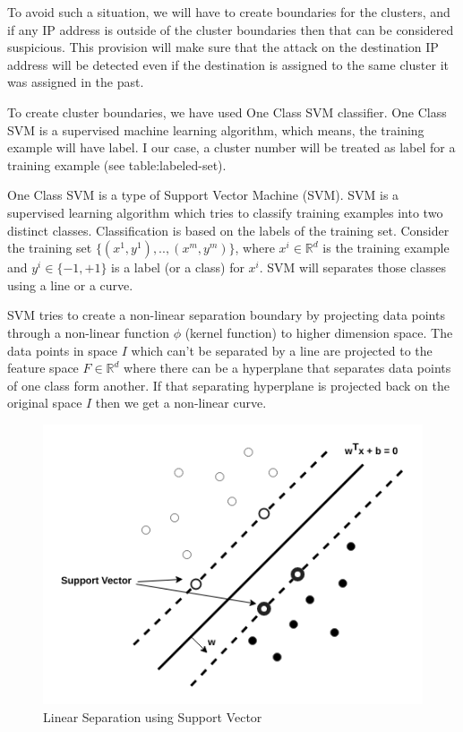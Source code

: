 \documentclass[12pt,oneside,a4paper]{article}
\begin{document}
To avoid such a situation, we will have to create boundaries for the clusters, and if any IP address is outside of the cluster boundaries then that can be considered suspicious. This provision will make sure that the attack on the destination IP address will be detected even if the destination is assigned to the same cluster it was assigned in the past.

To create cluster boundaries, we have used One Class SVM classifier. One Class SVM is a supervised machine learning algorithm, which means, the training example will have label. I our case, a cluster number will be treated as label for a training example (see table:labeled-set).

One Class SVM is a type of Support Vector Machine (SVM). SVM is a supervised learning algorithm which tries to classify training examples into two distinct classes. Classification is based on the labels of the training set.
Consider the training set $\{(x^{1},y^{1}), .., (x^{m},y^{m})\}$, where $x^{i} \in \mathbb{R}^d$ is the training example and $y^{i} \in \{-1, +1\}$ is a label (or a class) for $x^{i}$. SVM will separates those classes using a line or a curve.

SVM tries to create a non-linear separation boundary by projecting data points through a non-linear function $\phi$ (kernel function) to higher dimension space. The data points in space $I$ which can't be separated by a line are projected to the feature space $F \in \mathbb{R}^d$ where there can be a hyperplane that separates data points of one class form another. If that separating hyperplane is projected back on the original space $I$ then we get a non-linear curve.\cite{svm}

\begin{figure}[H]
\centering
\includegraphics[scale=0.5]{SVM}
\caption{Linear Separation using Support Vector} \label{fig:SVM}
\end{figure}
\end{document}
